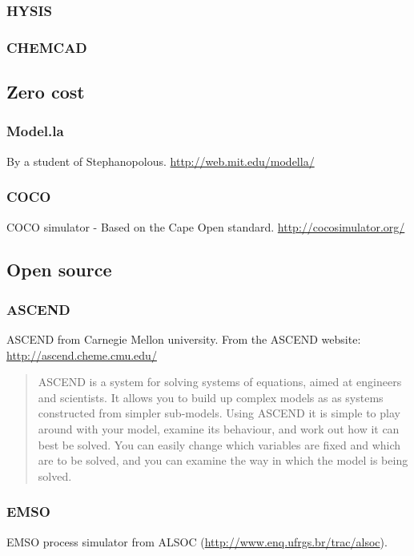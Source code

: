\subsubsection{HYSIS}

\subsubsection{CHEMCAD}

\subsection{Zero cost}
\subsubsection{Model.la}
By a student of Stephanopolous. \url{http://web.mit.edu/modella/}

\subsubsection{COCO}
COCO simulator - Based on the Cape Open standard.  \url{http://cocosimulator.org/}

\subsection{Open source}

\subsubsection{ASCEND}
ASCEND from Carnegie Mellon university.  From the ASCEND website: \url{http://ascend.cheme.cmu.edu/}
\begin{quote}
  ASCEND is a system for solving systems of equations, aimed at engineers and scientists. It allows you to build up complex models as as systems constructed from simpler sub-models. Using ASCEND it is simple to play around with your model, examine its behaviour, and work out how it can best be solved. You can easily change which variables are fixed and which are to be solved, and you can examine the way in which the model is being solved.
\end{quote}

\subsubsection{EMSO}
EMSO process simulator from ALSOC (\url{http://www.enq.ufrgs.br/trac/alsoc}).

